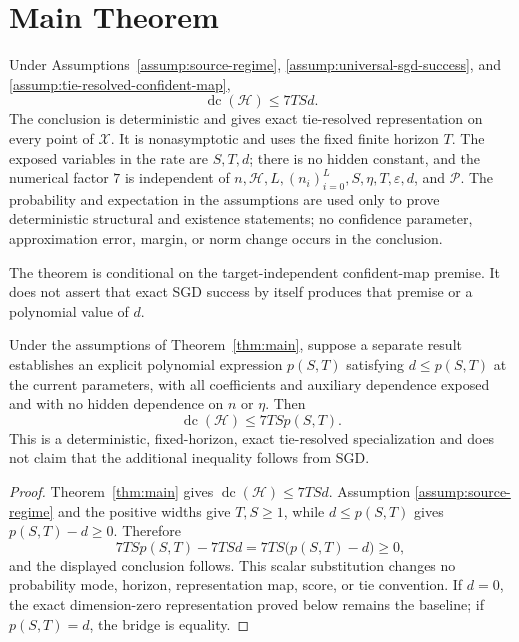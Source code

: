 \section{Main Theorem}
\label{sec:main-theorem}

\begin{theorem}
\label{thm:main}
Under Assumptions~\ref{assump:source-regime},
\ref{assump:universal-sgd-success}, and
\ref{assump:tie-resolved-confident-map},
\[
\operatorname{dc}(\mathcal H)\leq 7TSd.
\]
The conclusion is deterministic and gives exact tie-resolved representation on
every point of $\mathcal X$.  It is nonasymptotic and uses the fixed finite
horizon $T$.  The exposed variables in the rate are $S,T,d$; there is no
hidden constant, and the numerical factor $7$ is independent of
$n,\mathcal H,L,(n_i)_{i=0}^L,S,\eta,T,\varepsilon,d$, and $\mathcal P$.
The probability and expectation in the assumptions are used only to prove
deterministic structural and existence statements; no confidence parameter,
approximation error, margin, or norm change occurs in the conclusion.
\end{theorem}

The theorem is conditional on the target-independent confident-map premise.
It does not assert that exact SGD success by itself produces that premise or a
polynomial value of $d$.

\begin{corollary}
\label{cor:main-polynomial-specialization}
Under the assumptions of Theorem~\ref{thm:main}, suppose a separate result
establishes an explicit polynomial expression $p(S,T)$ satisfying
$d\leq p(S,T)$ at the current parameters, with all coefficients and auxiliary
dependence exposed and with no hidden dependence on $n$ or $\eta$.  Then
\[
\operatorname{dc}(\mathcal H)\leq7TSp(S,T).
\]
This is a deterministic, fixed-horizon, exact tie-resolved specialization and
does not claim that the additional inequality follows from SGD.
\end{corollary}

\begin{proof}
Theorem~\ref{thm:main} gives
$\operatorname{dc}(\mathcal H)\leq7TSd$.  Assumption
\ref{assump:source-regime} and the positive widths give $T,S\geq1$, while
$d\leq p(S,T)$ gives $p(S,T)-d\geq0$.  Therefore
\[
7TSp(S,T)-7TSd=7TS\bigl(p(S,T)-d\bigr)\geq0,
\]
and the displayed conclusion follows.  This scalar substitution changes no
probability mode, horizon, representation map, score, or tie convention.  If
$d=0$, the exact dimension-zero representation proved below remains the
baseline; if $p(S,T)=d$, the bridge is equality.
\end{proof}
